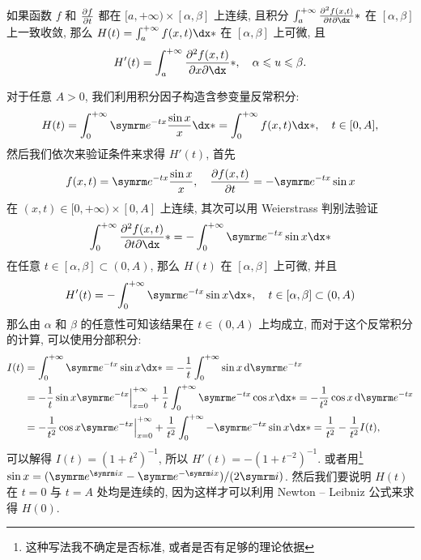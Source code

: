 \begin{exercise}[series=exer]
\begin{answer}
    如果函数 $ f $ 和 $ \pdv{f}{t} $ 都在 $ [a, +\infty) \times [\alpha, \beta] $ 上连续, 且积分 $ \int_{a}^{+\infty} \pdv{f(x, t)}{t} \dx* $ 在 $ [\alpha, \beta] $ 上一致收敛, 那么 $ H(t) = \int_{a}^{+\infty}f(x, t)\dx* $ 在 $ [\alpha, \beta] $ 上可微, 且
    \begin{align*}
      H'(t) = \int_{a}^{+\infty}\pdv{f(x, t)}{x}\dx*,\quad \alpha \le u \le \beta.
    \end{align*}

    对于任意 $ A > 0 $, 我们利用积分因子构造含参变量反常积分:
    \begin{align*}
      H(t) = \int_{0}^{+\infty} \me^{-tx}\frac{\sin x}{x} \dx* = \int_{0}^{+\infty} f(x, t) \dx*,\quad t \in [0, A],
    \end{align*}
    然后我们依次来验证条件来求得 $ H'(t) $, 首先
    \begin{align*}
      f(x, t) = \me^{-tx}\frac{\sin x}{x}, \quad \pdv{f(x, t)}{t} = -\me^{-tx}\sin x
    \end{align*}
    在 $ (x, t) \in [0, +\infty)\times [0, A] $ 上连续, 其次可以用 Weierstrass 判别法验证
    \begin{align*}
      \int_{0}^{+\infty} \pdv{f(x, t)}{t} \dx* = - \int_{0}^{+\infty} \me^{-tx}\sin x \dx*
    \end{align*}
    在任意 $ t \in [\alpha, \beta] \subset (0, A) $, 那么 $ H(t) $ 在 $ [\alpha, \beta] $ 上可微, 并且
    \begin{align*}
      H'(t) = - \int_{0}^{+\infty} \me^{-tx}\sin x \dx*, \quad t \in [\alpha, \beta] \subset (0, A)
    \end{align*}
    那么由 $ \alpha $ 和 $ \beta $ 的任意性可知该结果在 $ t\in (0, A) $ 上均成立, 而对于这个反常积分的计算, 可以使用分部积分:
    \begin{align*}
      I(t) & = \int_{0}^{+\infty} \me^{-tx}\sin x \dx* = -\frac{1}{t}\int_{0}^{+\infty} \sin x\dd{\me^{-tx}}\\
      & = -\frac{1}{t}\sin x\me^{-tx}\Big|_{x = 0}^{+\infty} + \frac{1}{t} \int_{0}^{+\infty} \me^{-tx}\cos x \dx* = -\frac{1}{t^{2}} \cos x\dd{\me^{-tx}}\\
      & = -\frac{1}{t^{2}}\cos x\me^{-tx}\Big|_{x = 0}^{+\infty} + \frac{1}{t^{2}}\int_{0}^{+\infty} -\me^{-tx}\sin x \dx* = \frac{1}{t^{2}} - \frac{1}{t^{2}} I(t),
    \end{align*}
    可以解得 $ I(t) = (1 + t^{2})^{-1} $, 所以 $ H'(t) = -(1 + t^{-2})^{-1} $. 或者用\footnote{这种写法我不确定是否标准, 或者是否有足够的理论依据} $ \sin x = (\me^{\mi x} - \me^{-\mi x})/(2\mi) $. 然后我们要说明 $ H(t) $ 在 $ t = 0 $ 与 $ t = A $ 处均是连续的, 因为这样才可以利用 Newton -- Leibniz 公式来求得 $ H(0) $.


\end{answer}
\end{exercise}
